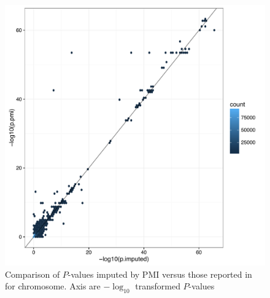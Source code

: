 \documentclass[a4paper,11pt]{report}
\begin{document}
\begin{figure}[h]
\includegraphics[width=\textwidth]{pmi_vs_imp.pdf}
\caption{Comparison of $P$-values imputed by PMI versus those reported in ~\citep{Okada2014-um} for chromosome. Axis are $-\log_{10}$ transformed $P$-values}
\label{fig:pmi_comparison}
\end{figure}

\end{document}
